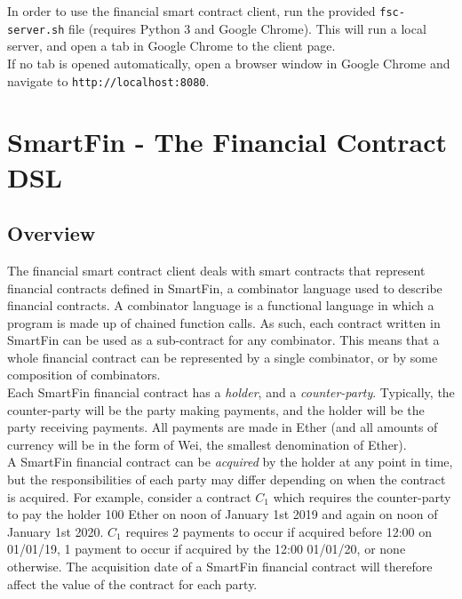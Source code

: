 In order to use the financial smart contract client, run the provided \texttt{fsc-server.sh} file (requires Python 3\cite{python} and Google Chrome\cite{chrome}). This will run a local server, and open a tab in Google Chrome to the client page. \\

If no tab is opened automatically, open a browser window in Google Chrome and navigate to \texttt{http://localhost:8080}.


\section{SmartFin - The Financial Contract DSL} \label{UG:DSL-guide}

\subsection{Overview} \label{UG:DSL-overview}

The financial smart contract client deals with smart contracts that represent financial contracts defined in SmartFin, a combinator language used to describe financial contracts. A combinator language is a functional language in which a program is made up of chained function calls. As such, each contract written in SmartFin can be used as a sub-contract for any combinator. This means that a whole financial contract can be represented by a single combinator, or by some composition of combinators. \\

Each SmartFin financial contract has a \textit{holder}, and a \textit{counter-party}. Typically, the counter-party will be the party making payments, and the holder will be the party receiving payments. All payments are made in Ether (and all amounts of currency will be in the form of Wei, the smallest denomination of Ether). \\

A SmartFin financial contract can be \textit{acquired} by the holder at any point in time, but the responsibilities of each party may differ depending on when the contract is acquired. For example, consider a contract $C_1$ which requires the counter-party to pay the holder 100 Ether on noon of January 1st 2019 and again on noon of January 1st 2020. $C_1$ requires 2 payments to occur if acquired before 12:00 on 01/01/19, 1 payment to occur if acquired by the 12:00 01/01/20, or none otherwise. The acquisition date of a SmartFin financial contract will therefore affect the value of the contract for each party. \\

